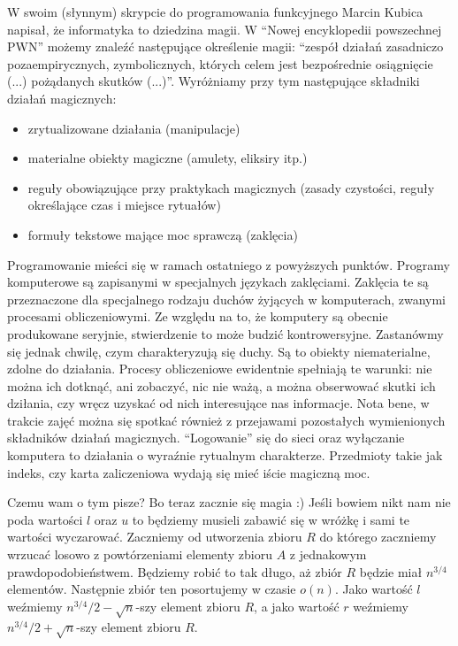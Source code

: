 W swoim (słynnym) skrypcie do programowania funkcyjnego Marcin Kubica napisał, że informatyka to dziedzina magii.
W ``Nowej encyklopedii powszechnej PWN'' możemy znaleźć następujące określenie magii: ``zespół działań zasadniczo pozaempirycznych, zymbolicznych, których celem jest bezpośrednie osiągnięcie (...) pożądanych skutków (...)''.
Wyróżniamy przy tym następujące składniki działań magicznych:
\begin{itemize}
 \item zrytualizowane działania (manipulacje)
 \item materialne obiekty magiczne (amulety, eliksiry itp.)
 \item reguły obowiązujące przy praktykach magicznych (zasady czystości, reguły określające czas i miejsce rytuałów)
 \item formuły tekstowe mające moc sprawczą (zaklęcia)
\end{itemize}
Programowanie mieści się w ramach ostatniego z powyższych punktów.
Programy komputerowe są zapisanymi w specjalnych językach zaklęciami.
Zaklęcia te są przeznaczone dla specjalnego rodzaju duchów żyjących w komputerach, zwanymi procesami obliczeniowymi.
Ze względu na to, że komputery są obecnie produkowane seryjnie, stwierdzenie to może budzić kontrowersyjne.
Zastanówmy się jednak chwilę, czym charakteryzują się duchy.
Są to obiekty niematerialne, zdolne do działania.
Procesy obliczeniowe ewidentnie spełniają te warunki: nie można ich dotknąć, ani zobaczyć, nic nie ważą, a można obserwować skutki ich dziłania, czy wręcz uzyskać od nich interesujące nas informacje.
Nota bene, w trakcie zajęć można się spotkać również z przejawami pozostałych wymienionych składników działań magicznych.
``Logowanie'' się do sieci oraz wyłączanie komputera to działania o wyraźnie rytualnym charakterze.
Przedmioty takie jak indeks, czy karta zaliczeniowa wydają się mieć iście magiczną moc.

Czemu wam o tym pisze?
Bo teraz zacznie się magia :)
Jeśli bowiem nikt nam nie poda wartości $l$ oraz $u$ to będziemy musieli zabawić się w wróżkę i sami te wartości wyczarować.
Zaczniemy od utworzenia zbioru $R$ do którego zaczniemy wrzucać losowo z powtórzeniami elementy zbioru $A$ z jednakowym prawdopodobieństwem.
Będziemy robić to tak długo, aż zbiór $R$ będzie miał $n^{3/4}$ elementów.
Następnie zbiór ten posortujemy w czasie $o(n)$.
Jako wartość $l$ weźmiemy $n^{3/4}/2 - \sqrt{n}$-szy element zbioru $R$, a jako wartość $r$ weźmiemy $n^{3/4}/2 + \sqrt{n}$-szy element zbioru $R$.

